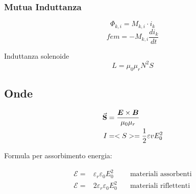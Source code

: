 \documentclass[a4paper]{scrarticle}
\begin{document}
\subsubsection*{Mutua Induttanza} 
\begin{equation}
    \varPhi_{k, i} = M_{k , i} \cdot i_k 
\end{equation}
\begin{equation}
    fem = -M_{k, i} \frac{di_k}{dt}
\end{equation}

Induttanza solenoide
\begin{equation*}
    L = \mu_0 \mu_r {N^2} S
\end{equation*}


\subsection{Onde}

\begin{align}
    \va S & = \frac{\bm E \times \bm B}{\mu_0 \mu_r}\\
    I & = <S> = \frac{1}{2}\varepsilon v E^2_0
\end{align}

Formula per assorbimento energia:

\begin{align}
    \mathcal E =&  \varepsilon_r \varepsilon_0 E_0^2\quad &\text {materiali assorbenti}\\
    \mathcal E =& 2\varepsilon_r \varepsilon_0 E_0^2\quad &\text {materiali riflettenti}
\end{align}

\pagebreak
\end{document}

